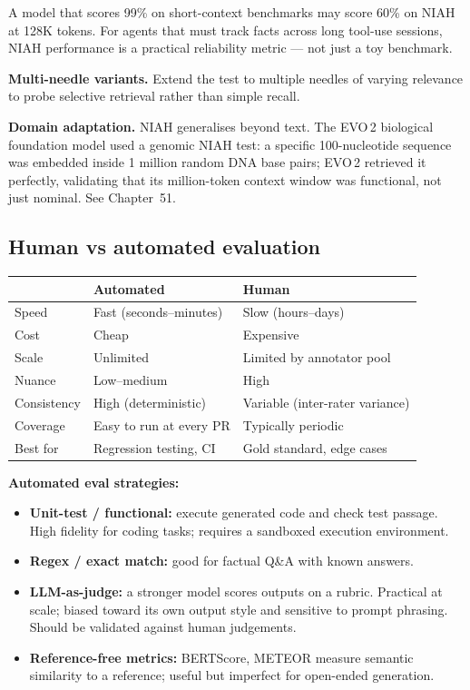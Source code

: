 \begin{intuitionbox}
  A model that scores 99\% on short-context benchmarks may score 60\% on NIAH at
  128K tokens. For agents that must track facts across long tool-use sessions, NIAH
  performance is a practical reliability metric --- not just a toy benchmark.
\end{intuitionbox}

\textbf{Multi-needle variants.} Extend the test to multiple needles of varying
relevance to probe selective retrieval rather than simple recall.

\textbf{Domain adaptation.} NIAH generalises beyond text. The EVO\,2 biological
foundation model used a genomic NIAH test: a specific 100-nucleotide sequence was
embedded inside 1 million random DNA base pairs; EVO\,2 retrieved it perfectly,
validating that its million-token context window was functional, not just nominal.
See Chapter~51.

\subsection{Human vs automated evaluation}

\begin{center}
\begin{tabular}{lll}
\toprule
 & \textbf{Automated} & \textbf{Human} \\
\midrule
Speed & Fast (seconds--minutes) & Slow (hours--days) \\
Cost & Cheap & Expensive \\
Scale & Unlimited & Limited by annotator pool \\
Nuance & Low--medium & High \\
Consistency & High (deterministic) & Variable (inter-rater variance) \\
Coverage & Easy to run at every PR & Typically periodic \\
Best for & Regression testing, CI & Gold standard, edge cases \\
\bottomrule
\end{tabular}
\end{center}

\textbf{Automated eval strategies:}
\begin{itemize}
  \item \textbf{Unit-test / functional:} execute generated code and check test passage.
    High fidelity for coding tasks; requires a sandboxed execution environment.
  \item \textbf{Regex / exact match:} good for factual Q\&A with known answers.
  \item \textbf{LLM-as-judge:} a stronger model scores outputs on a rubric.
    Practical at scale; biased toward its own output style and sensitive to prompt
    phrasing. Should be validated against human judgements.
  \item \textbf{Reference-free metrics:} BERTScore, METEOR measure semantic
    similarity to a reference; useful but imperfect for open-ended generation.
\end{itemize}

